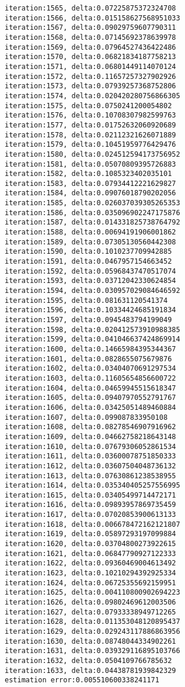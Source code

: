 \documentclass[11pt]{article}
\begin{document}
\begin{Verbatim}[commandchars=\\\{\}]
iteration:1565, delta:0.07225875372324708
iteration:1566, delta:0.015158627568951033
iteration:1567, delta:0.09029759607790311
iteration:1568, delta:0.07145692378639978
iteration:1569, delta:0.07964527436422486
iteration:1570, delta:0.06821834187758213
iteration:1571, delta:0.06801449114070124
iteration:1572, delta:0.11657257327902926
iteration:1573, delta:0.07939257368752806
iteration:1574, delta:0.020420280756866305
iteration:1575, delta:0.0750241200054802
iteration:1576, delta:0.10708307982599763
iteration:1577, delta:0.01752632060920689
iteration:1578, delta:0.02112321626071889
iteration:1579, delta:0.10451959776429476
iteration:1580, delta:0.024512594173756952
iteration:1581, delta:0.05070809395726883
iteration:1582, delta:0.1085323402035101
iteration:1583, delta:0.07934412221629827
iteration:1584, delta:0.09076018790202056
iteration:1585, delta:0.026037039305265353
iteration:1586, delta:0.035096902247175876
iteration:1587, delta:0.014331825738764792
iteration:1588, delta:0.00694191906001862
iteration:1589, delta:0.07305130560442308
iteration:1590, delta:0.1010237709942885
iteration:1591, delta:0.0467957154663452
iteration:1592, delta:0.05968437470517074
iteration:1593, delta:0.03712042330624854
iteration:1594, delta:0.030957029084646592
iteration:1595, delta:0.081631120541374
iteration:1596, delta:0.10334424685191834
iteration:1597, delta:0.0945483794199049
iteration:1598, delta:0.020412573910988385
iteration:1599, delta:0.041046637424869914
iteration:1600, delta:0.14665984395344367
iteration:1601, delta:0.0828655075679876
iteration:1602, delta:0.03404070691297534
iteration:1603, delta:0.11605654856600722
iteration:1604, delta:0.04659945515618347
iteration:1605, delta:0.09407970552791767
iteration:1606, delta:0.03425051489460884
iteration:1607, delta:0.099087833950108
iteration:1608, delta:0.08278546907916962
iteration:1609, delta:0.04662758218643148
iteration:1610, delta:0.07679306052861534
iteration:1611, delta:0.03600078751850333
iteration:1612, delta:0.03607504048736132
iteration:1613, delta:0.07630861238538955
iteration:1614, delta:0.035340405257556995
iteration:1615, delta:0.03405499714472171
iteration:1616, delta:0.09893957869735459
iteration:1617, delta:0.07020853900613133
iteration:1618, delta:0.006678472162121807
iteration:1619, delta:0.05897293197099884
iteration:1620, delta:0.03704800273922615
iteration:1621, delta:0.06847790927122333
iteration:1622, delta:0.09360469004613492
iteration:1623, delta:0.10210294392925334
iteration:1624, delta:0.06725355692159951
iteration:1625, delta:0.004110800902694223
iteration:1626, delta:0.09802469612003506
iteration:1627, delta:0.07933338949712265
iteration:1628, delta:0.011353048120895437
iteration:1629, delta:0.029243117886863956
iteration:1630, delta:0.08748044334902261
iteration:1631, delta:0.039329116895103766
iteration:1632, delta:0.0504109766785632
iteration:1633, delta:0.04438781939842329
estimation error:0.005510600338241171

    \end{Verbatim}

    \begin{center}
    \end{center}
    { \hspace*{\fill} \\}
    

    
    
    
    
\end{document}
